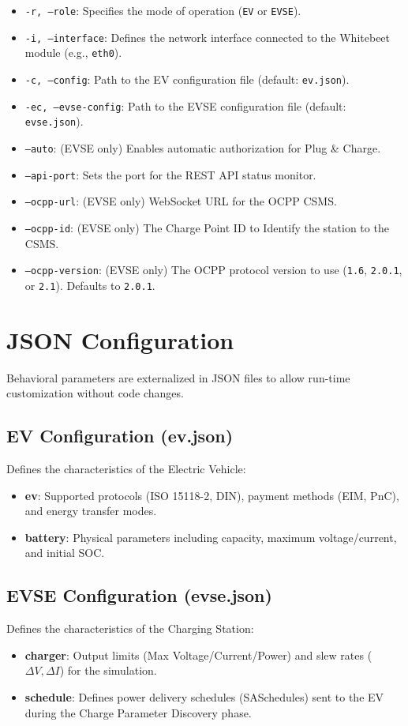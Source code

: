\documentclass[a4paper,11pt]{report}
\begin{document}
\begin{itemize}
    \item \texttt{-r, --role}: Specifies the mode of operation (\texttt{EV} or \texttt{EVSE}).
    \item \texttt{-i, --interface}: Defines the network interface connected to the Whitebeet module (e.g., \texttt{eth0}).
    \item \texttt{-c, --config}: Path to the EV configuration file (default: \texttt{ev.json}).
    \item \texttt{-ec, --evse-config}: Path to the EVSE configuration file (default: \texttt{evse.json}).
    \item \texttt{--auto}: (EVSE only) Enables automatic authorization for Plug \& Charge.

    \item \texttt{--api-port}: Sets the port for the REST API status monitor.
    \item \texttt{--ocpp-url}: (EVSE only) WebSocket URL for the OCPP CSMS.
    \item \texttt{--ocpp-id}: (EVSE only) The Charge Point ID to Identify the station to the CSMS.
    \item \texttt{--ocpp-version}: (EVSE only) The OCPP protocol version to use (\texttt{1.6}, \texttt{2.0.1}, or \texttt{2.1}). Defaults to \texttt{2.0.1}.
\end{itemize}

\section{JSON Configuration}
Behavioral parameters are externalized in JSON files to allow run-time customization without code changes.

\subsection{EV Configuration (ev.json)}
Defines the characteristics of the Electric Vehicle:
\begin{itemize}
    \item \textbf{ev}: Supported protocols (ISO 15118-2, DIN), payment methods (EIM, PnC), and energy transfer modes.
    \item \textbf{battery}: Physical parameters including capacity, maximum voltage/current, and initial SOC.
\end{itemize}

\subsection{EVSE Configuration (evse.json)}
Defines the characteristics of the Charging Station:
\begin{itemize}
    \item \textbf{charger}: Output limits (Max Voltage/Current/Power) and slew rates ($\Delta V, \Delta I$) for the simulation.
    \item \textbf{schedule}: Defines power delivery schedules (SASchedules) sent to the EV during the Charge Parameter Discovery phase.
\end{itemize}
\end{document}
